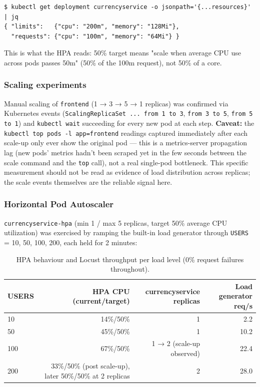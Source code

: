 \documentclass[a4paper,11pt]{article}
\begin{document}
\begin{verbatim}
$ kubectl get deployment currencyservice -o jsonpath='{...resources}' | jq
{ "limits":   {"cpu": "200m", "memory": "128Mi"},
  "requests": {"cpu": "100m", "memory": "64Mi"} }
\end{verbatim}
This is what the HPA reads: 50\% target means "scale when average CPU use across pods passes
50m" (50\% of the 100m request), not 50\% of a core.

\subsubsection{Scaling experiments}

Manual scaling of \texttt{frontend} (1 → 3 → 5 → 1 replicas) was confirmed via Kubernetes events
(\texttt{ScalingReplicaSet ... from 1 to 3}, \texttt{from 3 to 5}, \texttt{from 5 to 1}) and
\texttt{kubectl wait} succeeding for every new pod at each step. \textbf{Caveat:} the
\texttt{kubectl top pods -l app=frontend} readings captured immediately after each scale-up only
ever show the original pod — this is a metrics-server propagation lag (new pods' metrics hadn't
been scraped yet in the few seconds between the scale command and the \texttt{top} call), not a
real single-pod bottleneck. This specific measurement should not be read as evidence of load
distribution across replicas; the scale events themselves are the reliable signal here.

\subsubsection{Horizontal Pod Autoscaler}
\label{sec:hpa}

\texttt{currencyservice-hpa} (min 1 / max 5 replicas, target 50\% average CPU utilization) was
exercised by ramping the built-in load generator through \texttt{USERS} = 10, 50, 100, 200, each
held for 2 minutes:

\begin{table}[H]
\centering
\begin{tabular}{lrrr}
\toprule
USERS & HPA CPU (current/target) & currencyservice replicas & Load generator req/s \\
\midrule
10  & 14\%/50\% & 1 & 2.2 \\
50  & 45\%/50\% & 1 & 10.2 \\
100 & 67\%/50\% & 1 → 2 (scale-up observed) & 22.4 \\
200 & 33\%/50\% (post scale-up), later 50\%/50\% at 2 replicas & 2 & 28.0 \\
\bottomrule
\end{tabular}
\caption{HPA behaviour and Locust throughput per load level (0\% request failures throughout).}
\end{table}
\end{document}
